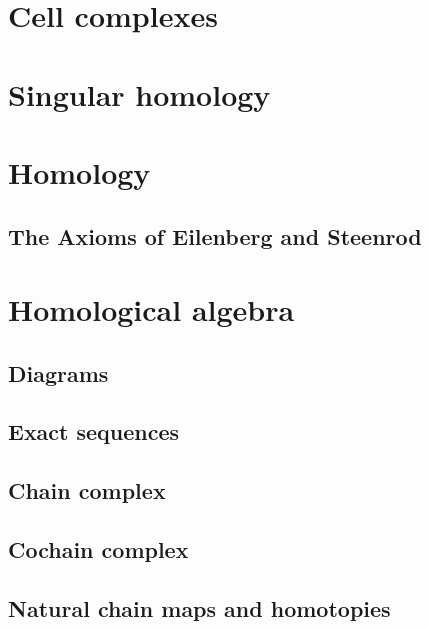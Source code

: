 \documentclass[11pt]{book} %
\begin{document}
\chapter{Cell complexes}




\chapter{Singular homology}
\chapter{Homology}
\section{The Axioms of Eilenberg and Steenrod}


\chapter{Homological algebra}
\section{Diagrams}
\section{Exact sequences}
\section{Chain complex}
\section{Cochain complex}
\section{Natural chain maps and homotopies}
\end{document}
